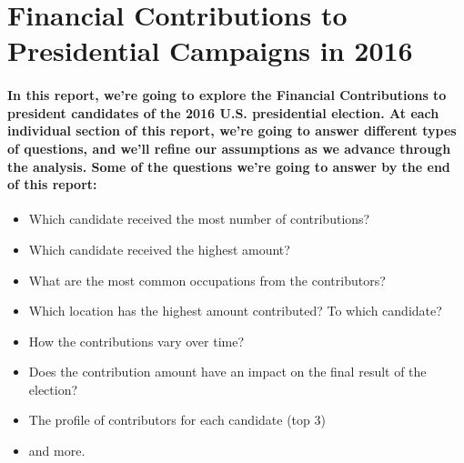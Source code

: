 \documentclass[]{article}
\title{}
\author{}
\date{}
\providecommand{\tightlist}{%
  \setlength{\itemsep}{0pt}\setlength{\parskip}{0pt}}
\let\oldparagraph\paragraph
\renewcommand{\paragraph}[1]{\oldparagraph{#1}\mbox{}}
\begin{document}
\section{Financial Contributions to Presidential Campaigns in
2016}\label{financial-contributions-to-presidential-campaigns-in-2016}

\paragraph{In this report, we're going to explore the Financial
Contributions to president candidates of the 2016 U.S. presidential
election. At each individual section of this report, we're going to
answer different types of questions, and we'll refine our assumptions as
we advance through the analysis. Some of the questions we're going to
answer by the end of this
report:}\label{in-this-report-were-going-to-explore-the-financial-contributions-to-president-candidates-of-the-2016-u.s.-presidential-election.-at-each-individual-section-of-this-report-were-going-to-answer-different-types-of-questions-and-well-refine-our-assumptions-as-we-advance-through-the-analysis.-some-of-the-questions-were-going-to-answer-by-the-end-of-this-report}

\begin{itemize}
\tightlist
\item
  Which candidate received the most number of contributions?
\item
  Which candidate received the highest amount?
\item
  What are the most common occupations from the contributors?
\item
  Which location has the highest amount contributed? To which candidate?
\item
  How the contributions vary over time?
\item
  Does the contribution amount have an impact on the final result of the
  election?
\item
  The profile of contributors for each candidate (top 3)
\item
  and more.
\end{itemize}
\end{document}
